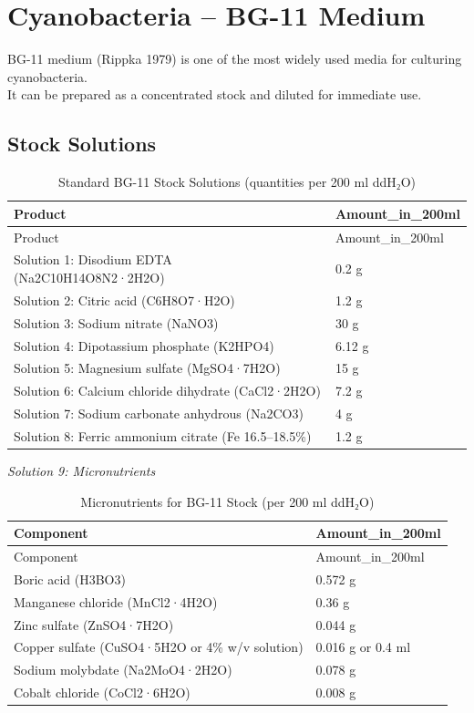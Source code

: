 \documentclass[
  11pt,
]{article}
\begin{document}
\section{Cyanobacteria -- BG-11
Medium}\label{cyanobacteria-bg-11-medium}

BG-11 medium (Rippka 1979) is one of the most widely used media for
culturing cyanobacteria.\\
It can be prepared as a concentrated stock and diluted for immediate
use.

\subsection{Stock Solutions}\label{stock-solutions-2}

\begin{longtable}[]{@{}ll@{}}
\caption{Standard BG-11 Stock Solutions (quantities per 200 ml
ddH₂O)}\tabularnewline
\toprule\noalign{}
Product & Amount\_in\_200ml \\
\midrule\noalign{}
\endfirsthead
\toprule\noalign{}
Product & Amount\_in\_200ml \\
\midrule\noalign{}
\endhead
\bottomrule\noalign{}
\endlastfoot
Solution 1: Disodium EDTA (Na2C10H14O8N2·2H2O) & 0.2 g \\
Solution 2: Citric acid (C6H8O7·H2O) & 1.2 g \\
Solution 3: Sodium nitrate (NaNO3) & 30 g \\
Solution 4: Dipotassium phosphate (K2HPO4) & 6.12 g \\
Solution 5: Magnesium sulfate (MgSO4·7H2O) & 15 g \\
Solution 6: Calcium chloride dihydrate (CaCl2·2H2O) & 7.2 g \\
Solution 7: Sodium carbonate anhydrous (Na2CO3) & 4 g \\
Solution 8: Ferric ammonium citrate (Fe 16.5--18.5\%) & 1.2 g \\
\end{longtable}

\emph{Solution 9: Micronutrients}

\begin{longtable}[]{@{}ll@{}}
\caption{Micronutrients for BG-11 Stock (per 200 ml
ddH₂O)}\tabularnewline
\toprule\noalign{}
Component & Amount\_in\_200ml \\
\midrule\noalign{}
\endfirsthead
\toprule\noalign{}
Component & Amount\_in\_200ml \\
\midrule\noalign{}
\endhead
\bottomrule\noalign{}
\endlastfoot
Boric acid (H3BO3) & 0.572 g \\
Manganese chloride (MnCl2·4H2O) & 0.36 g \\
Zinc sulfate (ZnSO4·7H2O) & 0.044 g \\
Copper sulfate (CuSO4·5H2O or 4\% w/v solution) & 0.016 g or 0.4 ml \\
Sodium molybdate (Na2MoO4·2H2O) & 0.078 g \\
Cobalt chloride (CoCl2·6H2O) & 0.008 g \\
\end{longtable}
\end{document}
